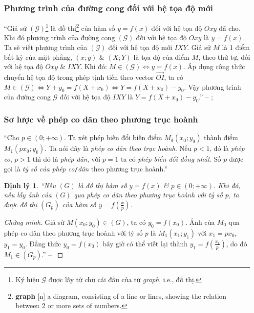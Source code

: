 \documentclass{article}
\numberwithin{equation}{section}
\newtheorem{dinhly}{Định lý}[section]
\begin{document}
\subsubsection{Phương trình của đường cong đối với hệ tọa độ mới}
``Giả sử $(\mathcal{G})$\footnote{Ký hiệu $\mathcal{G}$ được lấy từ chữ cái đầu của từ \textit{graph}, i.e., đồ thị.} là đồ thị\footnote{\textbf{graph} [n] a diagram, consisting of a line or lines, showing the relation between 2 or more sets of numbers.} của hàm số $y = f(x)$ đối với hệ tọa độ $Oxy$ đã cho. Khi đó phương trình của đường cong $(\mathcal{G})$ đối với hệ tọa độ $Oxy$ là $y = f(x)$. Ta sẽ viết phương trình của $(\mathcal{G})$ đối với hệ tọa độ mới $IXY$. Giả sử $M$ là 1 điểm bất kỳ của mặt phẳng, $(x;y)$ \& $(X;Y)$ là tọa độ của điểm $M$, theo thứ tự, đối với hệ tọa độ $Oxy$ \& $IXY$. Khi đó: $M\in(\mathcal{G})\Leftrightarrow y = f(x)$. Áp dụng công thức chuyển hệ tọa độ trong phép tịnh tiến theo vector $\overrightarrow{OI}$, ta có $M\in(\mathcal{G})\Leftrightarrow Y + y_0 = f(X + x_0)\Leftrightarrow Y = f(X + x_0) - y_0$. Vậy phương trình của đường cong $\mathcal{G}$ đối với hệ tọa độ $IXY$ là $Y = f(X + x_0) - y_0$.'' -- \cite[pp. 25--26]{SGK_Toan_12_giai_tich_nang_cao}; \cite[pp. 6--7]{TL_chuyen_Toan_Giai_Tich_12}

\subsubsection{Sơ lược về phép co dãn theo phương trục hoành}
``Cho $p\in(0;+\infty)$. Ta xét phép biến đổi biến điểm $M_0(x_0;y_0)$ thành điểm $M_1(px_0;y_0)$. Ta nói đây là \textit{phép co dãn theo trục hoành}. Nếu $p < 1$, đó là \textit{phép co}, $p > 1$ thì đó là \textit{phép dãn}, với $p = 1$ ta có \textit{phép biến đổi đồng nhất}. Số $p$ được gọi là \textit{tỷ số của phép co}\texttt{/}\textit{dãn} theo phương trục hoành.''

\begin{dinhly}
	``Nếu $(G)$ là đồ thị hàm số $y = f(x)$ \& $p\in(0;+\infty)$. Khi đó, nếu lấy ảnh của $(G)$ qua phép co dãn theo phương trục hoành với tỷ số $p$, ta được đồ thị $(G_p)$ của hàm số $y = f\left(\frac{x}{p}\right)$.
\end{dinhly}

\begin{proof}[Chứng minh]
	Giả sử $M(x_0;y_0)\in(G)$, ta có $y_0 = f(x_0)$. Ảnh của $M_0$ qua phép co dãn theo phương trục hoành với tỷ số $p$ là $M_1(x_1;y_1)$ với $x_1 = px_0$, $y_1 = y_0$. Đẳng thức $y_0 = f(x_0)$ bây giờ có thể viết lại thành $y_1 = f\left(\frac{x_1}{p}\right)$,  do đó $M_1\in(G_p)$.'' -- \cite[pp. 7--8]{TL_chuyen_Toan_Giai_Tich_12}
\end{proof}
\end{document}

